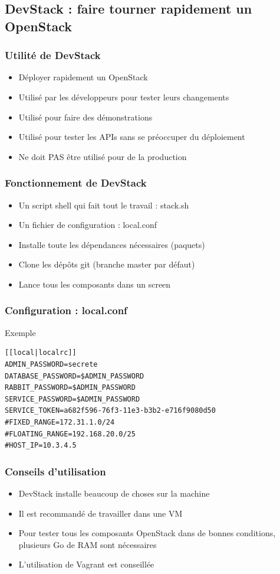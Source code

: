   \subsection[DevStack]{DevStack : faire tourner rapidement un OpenStack}

  \begin{frame}
    \frametitle{Utilité de DevStack}
    \begin{itemize}
      \item Déployer rapidement un OpenStack
      \item Utilisé par les développeurs pour tester leurs changements
      \item Utilisé pour faire des démonstrations
      \item Utilisé pour tester les APIs sans se préoccuper du déploiement
      \item Ne doit PAS être utilisé pour de la production
    \end{itemize}
  \end{frame}

  \begin{frame}
    \frametitle{Fonctionnement de DevStack}
    \begin{itemize}
      \item Un script shell qui fait tout le travail : stack.sh
      \item Un fichier de configuration : local.conf
      \item Installe toute les dépendances nécessaires (paquets)
      \item Clone les dépôts git (branche master par défaut)
      \item Lance tous les composants dans un screen
    \end{itemize}
  \end{frame}

  \begin{frame}[containsverbatim]
    \frametitle{Configuration : local.conf}
    Exemple
\begin{verbatim}
[[local|localrc]]
ADMIN_PASSWORD=secrete
DATABASE_PASSWORD=$ADMIN_PASSWORD
RABBIT_PASSWORD=$ADMIN_PASSWORD
SERVICE_PASSWORD=$ADMIN_PASSWORD
SERVICE_TOKEN=a682f596-76f3-11e3-b3b2-e716f9080d50
#FIXED_RANGE=172.31.1.0/24
#FLOATING_RANGE=192.168.20.0/25
#HOST_IP=10.3.4.5
\end{verbatim}
  \end{frame}

  \begin{frame}
    \frametitle{Conseils d'utilisation}
    \begin{itemize}
      \item DevStack installe beaucoup de choses sur la machine
      \item Il est recommandé de travailler dans une VM
      \item Pour tester tous les composants OpenStack dans de bonnes conditions, plusieurs Go de RAM sont nécessaires
      \item L'utilisation de Vagrant est conseillée
    \end{itemize}
  \end{frame}


